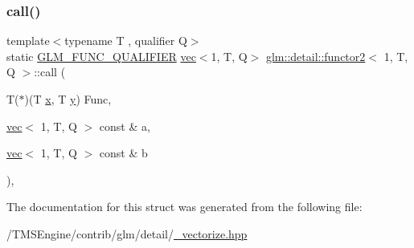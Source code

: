 \subsubsection{\texorpdfstring{call()}{call()}}
{\footnotesize\ttfamily template$<$typename T , qualifier Q$>$ \\
static \hyperlink{setup_8hpp_a33fdea6f91c5f834105f7415e2a64407}{G\+L\+M\+\_\+\+F\+U\+N\+C\+\_\+\+Q\+U\+A\+L\+I\+F\+I\+ER} \hyperlink{structglm_1_1vec}{vec}$<$1, T, Q$>$ \hyperlink{structglm_1_1detail_1_1functor2}{glm\+::detail\+::functor2}$<$ 1, T, Q $>$\+::call (\begin{DoxyParamCaption}\item[{T($\ast$)(T \hyperlink{_s_d_l__opengl_8h_ad0e63d0edcdbd3d79554076bf309fd47}{x}, T \hyperlink{_s_d_l__opengl_8h_a1675d9d7bb68e1657ff028643b4037e3}{y})}]{Func,  }\item[{\hyperlink{structglm_1_1vec}{vec}$<$ 1, T, Q $>$ const \&}]{a,  }\item[{\hyperlink{structglm_1_1vec}{vec}$<$ 1, T, Q $>$ const \&}]{b }\end{DoxyParamCaption})\hspace{0.3cm}{\ttfamily [inline]}, {\ttfamily [static]}}



The documentation for this struct was generated from the following file\+:\begin{DoxyCompactItemize}
\item 
/\+T\+M\+S\+Engine/contrib/glm/detail/\hyperlink{__vectorize_8hpp}{\+\_\+vectorize.\+hpp}\end{DoxyCompactItemize}
